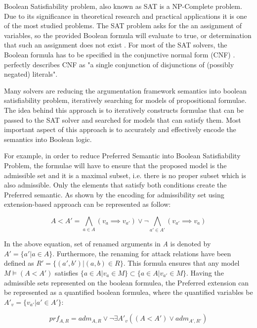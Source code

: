 Boolean Satisfiability problem, also known as SAT is a NP-Complete problem. Due to its significance in theoretical research and practical applications it is one of the most studied problems. The SAT problem asks for the an assignment of variables, so the provided Boolean formula will evaluate to true, or determination that such an assignment does not exist \citep{satSolver1}. For most of the SAT solvers, the Boolean formula has to be specified in the conjunctive normal form (CNF) \citep{SatSolver2}. \citet{cnfDefinition} perfectly describes CNF as "a single conjunction of disjunctions of (possibly negated) literals". 

Many solvers are reducing the argumentation framework semantics into boolean satisfiability problem, iteratively searching for models of propositional formulae. The idea behind this approach is to iteratively constructs formulae that can be passed to the SAT solver and searched for models that can satisfy them. Most important aspect of this approach is to accurately and effectively encode the semantics into Boolean logic. 

For example, in order to reduce Preferred Semantic into Boolean Satisfiability Problem, the formulae will have to ensure that the proposed model is the admissible set and it is a maximal subset, i.e. there is no proper subset which is also admissible. Only the elements that satisfy both conditions create the Preferred semantic. As shown by \citet{reasoningInArgumentationFr} the encoding for admissibility set using extension-based approach can be represented as follow:

\begin{equation}
A < A' = \bigwedge\limits_{a \in A} (v_a \implies v_{a'}) \lor \neg \bigwedge\limits_{a' \in A'} (v_{a'} \implies v_a)
\end{equation}

In the above equation, set of renamed arguments in \textit{A} is denoted by $A' = \{a' | a \in A\}$. Furthermore, the renaming for attack relations have been defined as $R' = \{(a',b') | (a,b) \in R\}$. This formula ensures that any model $ M \models (A < A')$ satisfies $ \{a \in A | v_a \in M\} \subset \{a \in A | v_{a'} \in M\} $. Having the admissible sets represented on the boolean formulea, the Preferred extension can be represented as a quantified boolean formulea, where the quantified variables be $ A'_v = \{v_{a'} | a' \in A'\} $:

\begin{equation}
prf_{A,R} = adm_{A,R} \lor \neg \exists A'_v ((A < A') \lor adm_{A',R'})
\end{equation}

